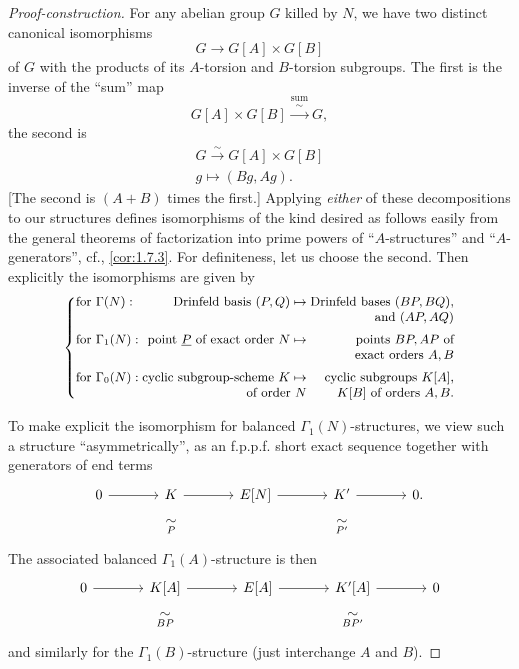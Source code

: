 \begin{proof}[Proof-construction]
For any abelian group $G$ killed by $N$, we have two distinct canonical isomorphisms
\begin{equation}\label{eq:3.5.1.1}
G \longrightarrow G[A] \times G[B]
\end{equation}
of $G$ with the products of its $A$-torsion and $B$-torsion subgroups. The first is the inverse of the ``sum'' map
\begin{equation}\label{eq:3.5.1.2}
G[A] \times G[B] \overset{\text{sum}}{\xrightarrow{\ \sim\ }} G,
\end{equation}
the second is
\begin{equation}\label{eq:3.5.1.3}
\begin{gathered}
G \xrightarrow{\ \sim\ } G[A] \times G[B] \\
g \longmapsto (Bg, Ag).
\end{gathered}
\end{equation}
[The second is $(A+B)$ times the first.] Applying \emph{either} of these decompositions to our structures defines isomorphisms of the kind desired as follows easily from the general theorems of factorization into prime powers of ``$A$-structures'' and ``$A$-generators'', cf., \ref{cor:1.7.3}. For definiteness, let us choose the second. Then explicitly the isomorphisms are given by
\[
\small\left\{
\begin{array}{@{}l@{\;}r@{\;}r@{}}
\text{for } \Gamma(N) : & \text{Drinfeld basis } (P,Q) \mapsto & \text{Drinfeld bases } (BP, BQ), \\
 & & \text{and } (AP, AQ) \\[5pt]
\text{for } \Gamma_1(N) : & \text{point } \underline{P} \text{ of exact order } N \mapsto & \text{points } BP, AP \text{ of} \\
 & & \text{exact orders } A, B \\[5pt]
\text{for } \Gamma_0(N) : & \text{cyclic subgroup-scheme } K \mapsto & \text{cyclic subgroups } K[A], \\
 & \text{of order } N & K[B] \text{ of orders } A, B.
\end{array}
\right.
\]

To make explicit the isomorphism for balanced $\Gamma_1(N)$-structures, we view such a structure ``asymmetrically'', as an f.p.p.f. short exact sequence together with generators of end terms
\[
\begin{tikzcd}[column sep=large, row sep=tiny]
0 \arrow[r] & K \arrow[r] & E[N] \arrow[r] & K' \arrow[r] & 0. \\
& \underset{P}{\sim} & & \underset{P'}{\sim}
\end{tikzcd}
\]
The associated balanced $\Gamma_1(A)$-structure is then
\[
\begin{tikzcd}[column sep=large, row sep=tiny]
0 \arrow[r] & K[A] \arrow[r] & E[A] \arrow[r] & K'[A] \arrow[r] & 0 \\
& \underset{BP}{\sim} & & \underset{BP'}{\sim}
\end{tikzcd}
\]
and similarly for the $\Gamma_1(B)$-structure (just interchange $A$ and $B$).
\end{proof}

